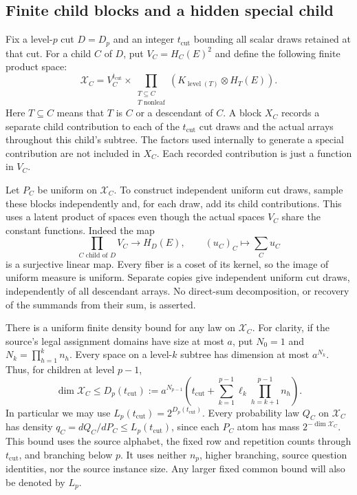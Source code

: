 \subsection{Finite child blocks and a hidden special child}

Fix a level-$p$ cut $D=D_p$ and an integer $t_{\mathrm{cut}}$ bounding all scalar draws
retained at that cut.  For a child $C$ of $D$, put $V_C=H_C(E)^2$ and define
the following finite product space:
\begin{equation}\label{eq:raw-child-block}
 \mathcal X_C=V_C^{t_{\mathrm{cut}}}\times
  \prod_{\substack{T\subseteq C\\T\text{ nonleaf}}}
       (K_{\operatorname{level}(T)}\otimes H_T(E)).
\end{equation}
Here $T\subseteq C$ means that $T$ is $C$ or a descendant of $C$.
A block $X_C$ records a separate child contribution to each of the $t_{\mathrm{cut}}$ cut
draws and the actual arrays throughout this child's subtree.  The factors
used internally to generate a special contribution are not included in
$X_C$.  Each recorded contribution is just a function in $V_C$.

Let $P_C$ be uniform on $\mathcal X_C$.  To construct independent uniform cut
draws, sample these blocks independently and, for each draw, add its child
contributions.  This uses a latent product of spaces even though the actual
spaces $V_C$ share the constant functions.  Indeed the map
\[
 \prod_{C\text{ child of }D}V_C\longrightarrow H_D(E),
 \qquad (u_C)_C\longmapsto\sum_Cu_C
\]
is a surjective linear map.  Every fiber is a coset of its kernel, so the
image of uniform measure is uniform.  Separate copies give independent
uniform cut draws, independently of all descendant arrays.  No direct-sum
decomposition, or recovery of the summands from their sum, is asserted.

There is a uniform finite density bound for any law on $\mathcal X_C$.
For clarity, if the source's legal assignment domains have size at most $a$,
put $N_0=1$ and $N_k=\prod_{h=1}^k n_h$.  Every space on a level-$k$ subtree
has dimension at most $a^{N_k}$.  Thus, for children at level $p-1$,
\begin{equation}\label{eq:block-dimension-bound}
 \dim\mathcal X_C\le
 D_p(t_{\mathrm{cut}}):=a^{N_{p-1}}\left(t_{\mathrm{cut}}+
  \sum_{k=1}^{p-1}\ell_k\prod_{h=k+1}^{p-1}n_h\right).
\end{equation}
In particular we may use $L_p(t_{\mathrm{cut}})=2^{D_p(t_{\mathrm{cut}})}$.  Every probability law $Q_C$ on
$\mathcal X_C$ has density $q_C=dQ_C/dP_C\le L_p(t_{\mathrm{cut}})$, since each $P_C$ atom has
mass $2^{-\dim\mathcal X_C}$.  This bound uses the source alphabet, the fixed row
and repetition counts through $t_{\mathrm{cut}}$, and branching below $p$.  It uses neither
$n_p$, higher branching, source question identities, nor the source instance
size.  Any larger fixed common bound will also be denoted by $L_p$.

